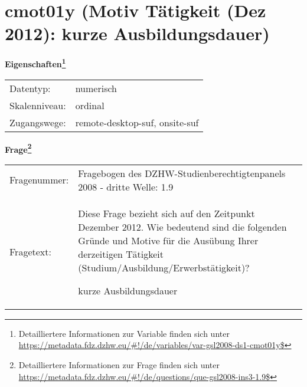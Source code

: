 
    \setcounter{footnote}{0}

    \vspace*{-1.8cm}
	\section{cmot01y (Motiv Tätigkeit (Dez 2012): kurze Ausbildungsdauer)}
	\label{section:cmot01y}



    \vspace*{0.5cm}
    \noindent\textbf{Eigenschaften\footnote{Detailliertere Informationen zur Variable finden sich unter
		\url{https://metadata.fdz.dzhw.eu/\#!/de/variables/var-gsl2008-ds1-cmot01y$}}}\\
	\begin{tabularx}{\hsize}{@{}lX}
	Datentyp: & numerisch \\
	Skalenniveau: & ordinal \\
	Zugangswege: &
	  remote-desktop-suf, 
	  onsite-suf
 \\
    \end{tabularx}



				\vspace*{0.5cm}
                \noindent\textbf{Frage\footnote{Detailliertere Informationen zur Frage finden sich unter
		              \url{https://metadata.fdz.dzhw.eu/\#!/de/questions/que-gsl2008-ins3-1.9$}}}\\
				\begin{tabularx}{\hsize}{@{}lX}
					Fragenummer: &
					  Fragebogen des DZHW-Studienberechtigtenpanels 2008 - dritte Welle:
					  1.9
 \\
					Fragetext: & Diese Frage bezieht sich auf den Zeitpunkt Dezember 2012. Wie bedeutend sind die folgenden Gründe und Motive für die Ausübung Ihrer derzeitigen Tätigkeit (Studium/Ausbildung/Erwerbstätigkeit)?\par  kurze Ausbildungsdauer \\
				\end{tabularx}





